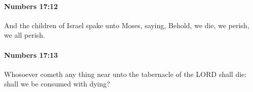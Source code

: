 		\paragraph{Numbers 17:12} %
			\label{NUMBERS-17-12}

			And the children of Israel spake unto Moses, saying, Behold, we die, we perish, we all perish.


		\paragraph{Numbers 17:13} %
			\label{NUMBERS-17-13}

			Whosoever cometh any thing near unto the tabernacle of the LORD shall die: shall we be consumed with dying?

